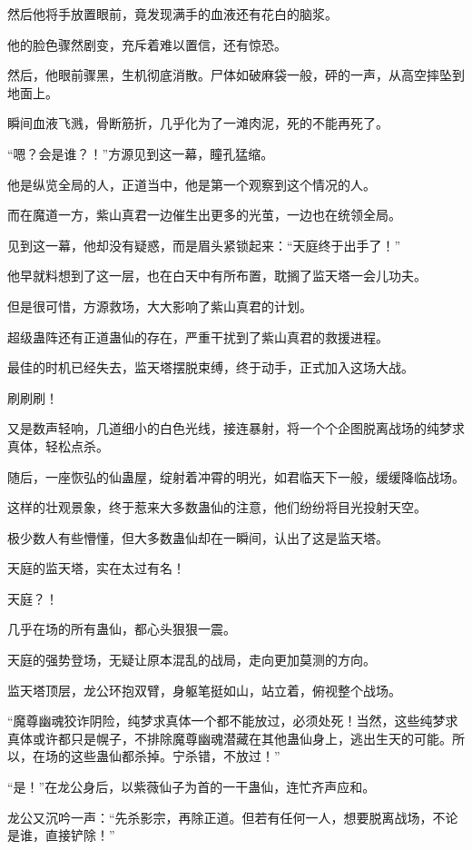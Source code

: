 \begin{this_body}
然后他将手放置眼前，竟发现满手的血液还有花白的脑浆。

他的脸色骤然剧变，充斥着难以置信，还有惊恐。

然后，他眼前骤黑，生机彻底消散。尸体如破麻袋一般，砰的一声，从高空摔坠到地面上。

瞬间血液飞溅，骨断筋折，几乎化为了一滩肉泥，死的不能再死了。

“嗯？会是谁？！”方源见到这一幕，瞳孔猛缩。

他是纵览全局的人，正道当中，他是第一个观察到这个情况的人。

而在魔道一方，紫山真君一边催生出更多的光茧，一边也在统领全局。

见到这一幕，他却没有疑惑，而是眉头紧锁起来：“天庭终于出手了！”

他早就料想到了这一层，也在白天中有所布置，耽搁了监天塔一会儿功夫。

但是很可惜，方源救场，大大影响了紫山真君的计划。

超级蛊阵还有正道蛊仙的存在，严重干扰到了紫山真君的救援进程。

最佳的时机已经失去，监天塔摆脱束缚，终于动手，正式加入这场大战。

刷刷刷！

又是数声轻响，几道细小的白色光线，接连暴射，将一个个企图脱离战场的纯梦求真体，轻松点杀。

随后，一座恢弘的仙蛊屋，绽射着冲霄的明光，如君临天下一般，缓缓降临战场。

这样的壮观景象，终于惹来大多数蛊仙的注意，他们纷纷将目光投射天空。

极少数人有些懵懂，但大多数蛊仙却在一瞬间，认出了这是监天塔。

天庭的监天塔，实在太过有名！

天庭？！

几乎在场的所有蛊仙，都心头狠狠一震。

天庭的强势登场，无疑让原本混乱的战局，走向更加莫测的方向。

监天塔顶层，龙公环抱双臂，身躯笔挺如山，站立着，俯视整个战场。

“魔尊幽魂狡诈阴险，纯梦求真体一个都不能放过，必须处死！当然，这些纯梦求真体或许都只是幌子，不排除魔尊幽魂潜藏在其他蛊仙身上，逃出生天的可能。所以，在场的这些蛊仙都杀掉。宁杀错，不放过！”

“是！”在龙公身后，以紫薇仙子为首的一干蛊仙，连忙齐声应和。

龙公又沉吟一声：“先杀影宗，再除正道。但若有任何一人，想要脱离战场，不论是谁，直接铲除！”


\end{this_body}
